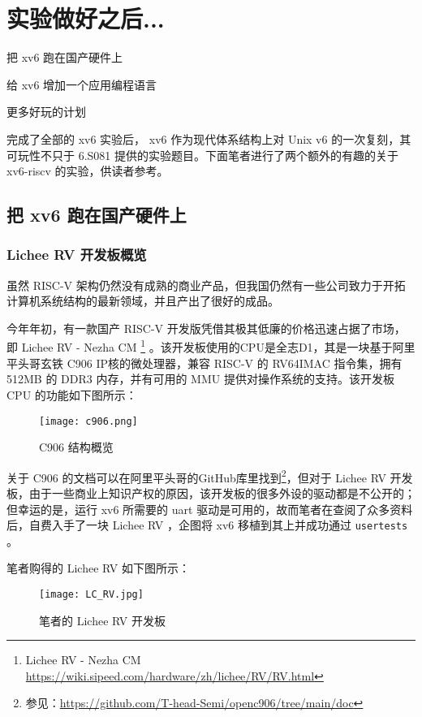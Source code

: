 \chapter{实验做好之后...}
\begin{introduction}
    \item 把 xv6 跑在国产硬件上
    \item 给 xv6 增加一个应用编程语言
    \item 更多好玩的计划
\end{introduction}

完成了全部的 xv6 实验后， xv6 作为现代体系结构上对 Unix v6 的一次复刻，其可玩性不只于 6.S081 提供的实验题目。下面笔者进行了两个额外的有趣的关于 xv6-riscv 的实验，供读者参考。

\section{把 xv6 跑在国产硬件上}

\subsection{Lichee RV 开发板概览}

虽然 RISC-V 架构仍然没有成熟的商业产品，但我国仍然有一些公司致力于开拓计算机系统结构的最新领域，并且产出了很好的成品。

今年年初，有一款国产 RISC-V 开发版凭借其极其低廉的价格迅速占据了市场，即 Lichee RV - Nezha CM \footnote{Lichee RV - Nezha CM \url{https://wiki.sipeed.com/hardware/zh/lichee/RV/RV.html}} 。该开发板使用的CPU是全志D1，其是一块基于阿里平头哥玄铁 C906 IP核的微处理器，兼容 RISC-V 的 RV64IMAC 指令集，拥有 512MB 的 DDR3 内存，并有可用的 MMU 提供对操作系统的支持。该开发板 CPU 的功能如下图所示：

\begin{figure}[H]
  \centering
  \texttt{[image: c906.png]}
  \caption{ C906 结构概览 }
\end{figure}

关于 C906 的文档可以在阿里平头哥的GitHub库里找到\footnote{参见：\url{https://github.com/T-head-Semi/openc906/tree/main/doc}}，但对于 Lichee RV 开发板，由于一些商业上知识产权的原因，该开发板的很多外设的驱动都是不公开的；但幸运的是，运行 xv6 所需要的 uart 驱动是可用的，故而笔者在查阅了众多资料后，自费入手了一块 Lichee RV ，企图将 xv6 移植到其上并成功通过 \lstinline{usertests} 。

笔者购得的 Lichee RV 如下图所示：

\begin{figure}[H]
  \centering
  \texttt{[image: LC\_RV.jpg]}
  \caption{ 笔者的 Lichee RV 开发板 }
\end{figure}

